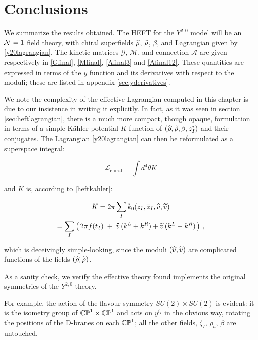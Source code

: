 \section{Conclusions}

We summarize the results obtained. The HEFT for the $Y^{2,0}$ model will be an $\mathcal{N} = 1$ field theory, with chiral superfields $\widehat{\rho}$, $\widetilde{\rho}$, $\beta$, and Lagrangian given by \eqref{y20lagrangian}. The kinetic matrices $\mathcal{G}$, $\mathcal{M}$, and connection $\mathcal{A}$ are given respectively in \eqref{Gfinal}, \eqref{Mfinal}, \eqref{Afinal3} and \eqref{Afinal12}. These quantities are expressed in terms of the $y$ function and its derivatives with respect to the moduli; these are listed in appendix \ref{sec:yderivatives}.

We note the complexity of the effective Lagrangian computed in this chapter is due to our insistence in writing it explicitly. In fact, as it was seen in section \ref{sec:heftlagrangian}, there is a much more compact, though opaque, formulation in terms of a simple K\"ahler potential $K$ function of $(\widehat{\rho},\widetilde{\rho},\beta,z_I^i)$ and their conjugates. The Lagrangian \eqref{y20lagrangian} can then be reformulated as a superspace integral:

\begin{equation}
	\mathcal{L}_\mathrm{chiral} = \int d^4 \theta K
	\label{}
\end{equation}

and $K$ is, according to \eqref{heftkahler}:

\begin{gather}
	K = 2\pi \sum_I k_0(z_I, \overline{z}_I,\widehat{v}, \widetilde{v}) \\
	= \sum_I \left(\, 2\pi f(t_I) \;+\; \widehat{v}\, (k^L + k^R) + \widetilde{v}\,(k^L - k^R)\, \right)\,,
	\label{effectivekahler}
\end{gather}

which is deceivingly simple-looking, since the moduli $(\widehat{v},\widetilde{v})$ are complicated functions of the fields $(\widehat{\rho},\widetilde{\rho})$.

As a sanity check, we verify the effective theory found implements the original symmetries of the $Y^{2,0}$ theory. 

For example, the action of the flavour symmetry $SU(2) \times SU(2)$ is evident: it is the isometry group of $\mathbb{CP}^1 \times \mathbb{CP}^1$ and acts on $y^{i_I}$ in the obvious way, rotating the positions of the D-branes on each $\mathbb{CP}^1$; all the other fields, $\zeta_I$, $\rho_a$, $\beta$ are untouched.

